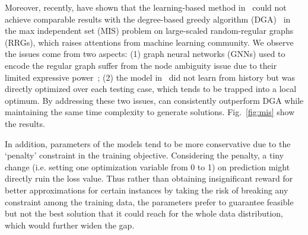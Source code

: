 
Moreover, recently, \cite{angelini2022cracking} have shown that the learning-based method in~\citep{schuetz2022combinatorial} could not achieve comparable results with the degree-based greedy algorithm (DGA)~\citep{angelini2019monte} in the max independent set (MIS) problem on large-scaled random-regular graphs (RRGs), which raises attentions from machine learning community. We observe the issues come from two aspects: (1) graph neural networks (GNNs) used to encode the regular graph suffer from the node ambiguity issue due to their limited expressive power~\citep{xu2018powerful}; (2) the model in~\citep{schuetz2022combinatorial} did not learn from history but was directly optimized over each testing case, which tends to be trapped into a local optimum. By addressing these two issues, \proj can consistently outperform DGA while maintaining the same time complexity to generate solutions. Fig.~\ref{fig:mis} show the results. %



\iffalse
In addition, parameters of the models tend to be more conservative due to the `penalty' constraint in the training objective. Considering the penalty, a tiny change (i.e. setting one optimization variable from 0 to 1) on prediction might directly ruin the loss value. Thus rather than obtaining insignificant reward for better approximations for certain instances by taking the risk of breaking any constraint among the training data, the parameters prefer to guarantee feasible but not the best solution that it could reach for the whole data distribution, which would further widen the gap.


